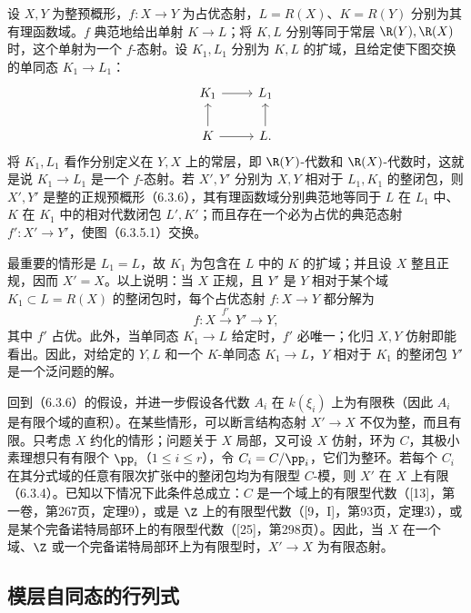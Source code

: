 设 $X,Y$ 为整预概形，$f:X\to Y$ 为占优态射，$L=R(X)$、$K=R(Y)$ 分别为其有理函数域。$f$ 典范地给出单射 $K\to L$；将 $K,L$ 分别等同于常层 $\R(Y),\R(X)$ 时，这个单射为一个 $f$-态射。设 $K_1,L_1$ 分别为 $K,L$ 的扩域，且给定使下图交换的单同态 $K_1\to L_1$：
\[
\begin{tikzcd}
K_1\arrow[r]&L_1\\
K\arrow[r]\arrow[u]&L.\arrow[u]
\end{tikzcd}
\]
将 $K_1,L_1$ 看作分别定义在 $Y,X$ 上的常层，即 $\R(Y)$-代数和 $\R(X)$-代数时，这就是说 $K_1\to L_1$ 是一个 $f$-态射。若 $X',Y'$ 分别为 $X,Y$ 相对于 $L_1,K_1$ 的整闭包，则 $X',Y'$ 是整的正规预概形（6.3.6），其有理函数域分别典范地等同于 $L$ 在 $L_1$ 中、$K$ 在 $K_1$ 中的相对代数闭包 $L',K'$；而且存在一个必为占优的典范态射 $f':X'\to Y'$，使图（6.3.5.1）交换。

最重要的情形是 $L_1=L$，故 $K_1$ 为包含在 $L$ 中的 $K$ 的扩域；并且设 $X$ 整且正规，因而 $X'=X$。以上说明：当 $X$ 正规，且 $Y'$ 是 $Y$ 相对于某个域 $K_1\subset L=R(X)$ 的整闭包时，每个占优态射 $f:X\to Y$ 都分解为
\[
f:X\xrightarrow{f'}Y'\longrightarrow Y,
\]
其中 $f'$ 占优。此外，当单同态 $K_1\to L$ 给定时，$f'$ 必唯一；化归 $X,Y$ 仿射即能看出。因此，对给定的 $Y,L$ 和一个 $K$-单同态 $K_1\to L$，$Y$ 相对于 $K_1$ 的整闭包 $Y'$ 是一个泛问题的解。

回到（6.3.6）的假设，并进一步假设各代数 $A_i$ 在 $k(\xi_i)$ 上为有限秩（因此 $A_i$ 是有限个域的直积）。在某些情形，可以断言结构态射 $X'\to X$ 不仅为整，而且有限。只考虑 $X$ 约化的情形；问题关于 $X$ 局部，又可设 $X$ 仿射，环为 $C$，其极小素理想只有有限个 $\pp_i$（$1\leq i\leq r$），令 $C_i=C/\pp_i$，它们为整环。若每个 $C_i$ 在其分式域的任意有限次扩张中的整闭包均为有限型 $C$-模，则 $X'$ 在 $X$ 上有限（6.3.4）。已知以下情况下此条件总成立：$C$ 是一个域上的有限型代数（[13]，第一卷，第267页，定理9），或是 $\Z$ 上的有限型代数（[9，I]，第93页，定理3），或是某个完备诺特局部环上的有限型代数（[25]，第298页）。因此，当 $X$ 在一个域、$\Z$ 或一个完备诺特局部环上为有限型时，$X'\to X$ 为有限态射。

\subsection{模层自同态的行列式}

